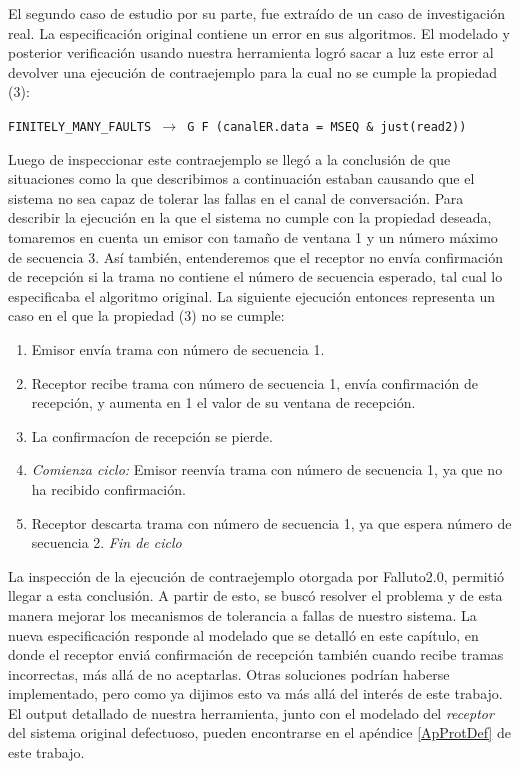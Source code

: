 \documentclass[titlepage, 12pt]{book}
\newcommand{\textff}[1]{\begin{center}\texttt{#1}\end{center}}
\begin{document}
El segundo caso de estudio por su parte, fue extra\'ido de un caso de investigaci\'on real. La especificaci\'on original contiene un error en sus algoritmos. El modelado y posterior verificaci\'on usando nuestra herramienta logr\'o sacar a luz este error al devolver una ejecuci\'on de contraejemplo para la cual no se cumple la propiedad (3): \textff{FINITELY\_MANY\_FAULTS $\rightarrow$ G~F~(canalER.data = MSEQ~\&~just(read2))} Luego de inspeccionar este contraejemplo se lleg\'o a la conclusi\'on de que situaciones como la que describimos a continuaci\'on estaban causando que el sistema no sea capaz de tolerar las fallas en el canal de conversaci\'on. Para describir la ejecuci\'on en la que el sistema no cumple con la propiedad deseada, tomaremos en cuenta un emisor con tama\~no de ventana 1 y un n\'umero m\'aximo de secuencia 3. As\'i tambi\'en, entenderemos que el receptor no env\'ia confirmaci\'on de recepci\'on si la trama no contiene el n\'umero de secuencia esperado, tal cual lo especificaba el algoritmo original. La siguiente ejecuci\'on entonces representa un caso en el que la propiedad (3) no se cumple:

\begin{enumerate}
\item Emisor env\'ia trama con n\'umero de secuencia 1.
\item Receptor recibe trama con n\'umero de secuencia 1, env\'ia confirmaci\'on de recepci\'on, y aumenta en 1 el valor de su ventana de recepci\'on.
\item La confirmac\'ion de recepci\'on se pierde.
\item \textit{Comienza ciclo:} Emisor reenv\'ia trama con n\'umero de secuencia 1, ya que no ha recibido confirmaci\'on.
\item Receptor descarta trama con n\'umero de secuencia 1, ya que espera n\'umero de secuencia 2. \textit{Fin de ciclo}
\end{enumerate}

La inspecci\'on de la ejecuci\'on de contraejemplo otorgada por Falluto2.0, permiti\'o llegar a esta conclusi\'on. A partir de esto, se busc\'o resolver el problema y de esta manera mejorar los mecanismos de tolerancia a fallas de nuestro sistema. La nueva especificaci\'on responde al modelado que se detall\'o en este cap\'itulo, en donde el receptor envi\'a confirmaci\'on de recepci\'on tambi\'en cuando recibe tramas incorrectas, m\'as all\'a de no aceptarlas. Otras soluciones podr\'ian haberse implementado, pero como ya dijimos esto va m\'as all\'a del inter\'es de este trabajo. El output detallado de nuestra herramienta, junto con el modelado del \textit{receptor} del sistema original defectuoso, pueden encontrarse en el ap\'endice \ref{ApProtDef} de este trabajo.
\end{document}

